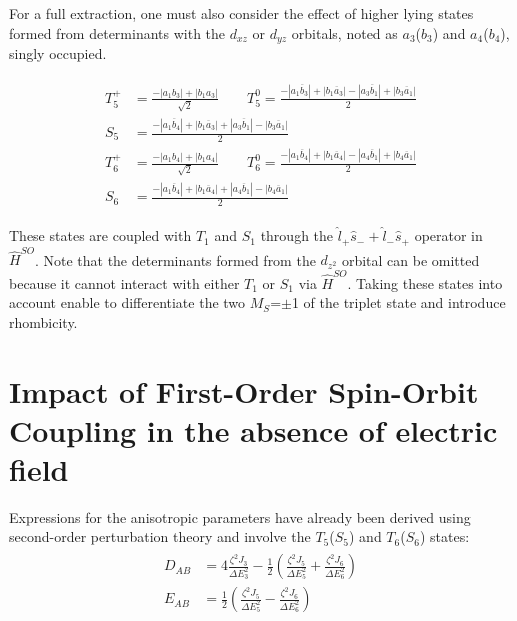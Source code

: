 \documentclass[12pt]{report}
\numberwithin{equation}{section}
\begin{document}
For a full extraction, one must also consider the effect of higher lying states formed from determinants with the $d_{xz}$ or $d_{yz}$ orbitals, noted as $a_3$($b_3$) and $a_4$($b_4$), singly occupied. 

\begin{align}\label{T5T6}
    \begin{split}
        T_5^+&=\frac{-|a_1b_3|+|b_1a_3|}{\sqrt{2}} \qquad T_5^0=\frac{-|a_1\overline{b}_3|+|b_1\overline{a}_3|-|a_3\overline{b}_1|+|b_3\overline{a}_1|}{2}\\
        S_5&=\frac{-|a_1\overline{b}_4|+|b_1\overline{a}_3|+|a_3\overline{b}_1|-|b_3\overline{a}_1|}{2}\\
        T_6^+&=\frac{-|a_1b_4|+|b_1a_4|}{\sqrt{2}} \qquad T_6^0=\frac{-|a_1\overline{b}_4|+|b_1\overline{a}_4|-|a_4\overline{b}_1|+|b_4\overline{a}_1|}{2}\\
        S_6&=\frac{-|a_1\overline{b}_4|+|b_1\overline{a}_4|+|a_4\overline{b}_1|-|b_4\overline{a}_1|}{2}
    \end{split}
\end{align}

These states are coupled with $T_1$ and $S_1$ through the $\hat{l}_+ \hat{s}_- + \hat{l}_-\hat{s}_+$ operator in $\hat{H}^{SO}$.
Note that the determinants formed from the $d_{z^2}$ orbital can be omitted because it cannot interact with either $T_1$ or $S_1$ via $\hat{H}^{SO}$.
Taking these states into account enable to differentiate the two $M_S$=$\pm$1 of the triplet state and introduce rhombicity.

\section{Impact of First-Order Spin-Orbit Coupling in the absence of electric field}\label{sec:NoField}

Expressions for the anisotropic parameters have already been derived using second-order perturbation theory and involve the $T_5$($S_5$) and $T_6$($S_6$) states:
\begin{align}\label{eq:PertCu2Cl5}
    \begin{split}
        D_{AB}&=4\frac{\zeta^2 J_3}{\Delta E^2_3}-\frac{1}{2}(\frac{\zeta^2 J_5}{\Delta E^2_5}+\frac{\zeta^2 J_6}{\Delta E^2_6})\\
        E_{AB}&=\frac{1}{2}(\frac{\zeta^2 J_5}{\Delta E^2_5}-\frac{\zeta^2 J_6}{\Delta E^2_6})
    \end{split}
\end{align}
\end{document}
